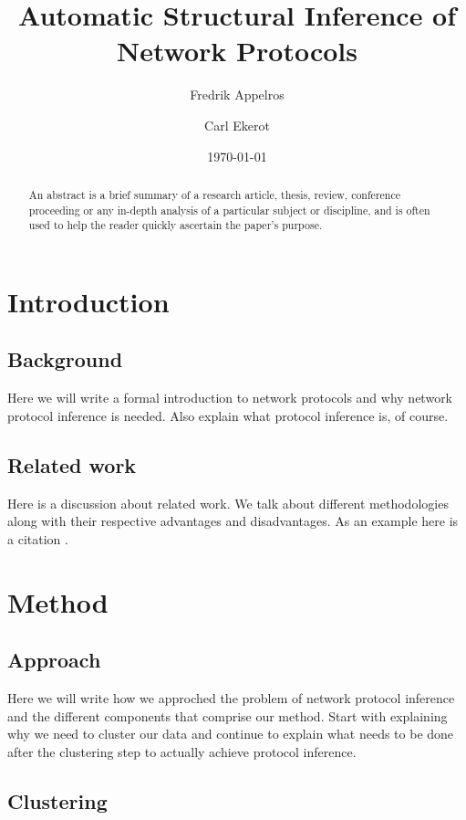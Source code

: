 \documentclass[a4paper]{report}
\begin{document}
\title{Automatic Structural Inference of Network Protocols}
\author{Fredrik Appelros \and Carl Ekerot}
\date{\today}
\maketitle

\begin{abstract}
An abstract is a brief summary of a research article, thesis, review,
conference proceeding or any in-depth analysis of a particular subject or
discipline, and is often used to help the reader quickly ascertain the paper's
purpose.
\end{abstract}

\tableofcontents

\chapter{Introduction}

\section{Background}
Here we will write a formal introduction to network protocols and why network
protocol inference is needed. Also explain what protocol inference is, of
course.

\section{Related work}
Here is a discussion about related work. We talk about different methodologies
along with their respective advantages and disadvantages. As an example here
is a citation \cite{cui07}.

\chapter{Method}

\section{Approach}
Here we will write how we approched the problem of network protocol inference
and the different components that comprise our method. Start with explaining
why we need to cluster our data and continue to explain what needs to be done
after the clustering step to actually achieve protocol inference.

\section{Clustering}
\end{document}
